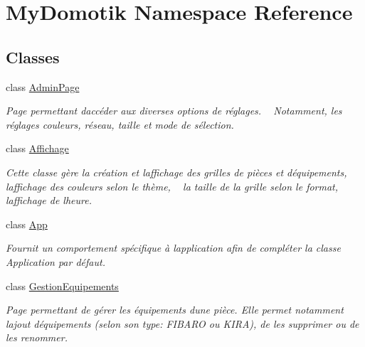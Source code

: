 \hypertarget{namespace_my_domotik}{}\section{My\+Domotik Namespace Reference}
\label{namespace_my_domotik}
\subsection*{Classes}
\begin{DoxyCompactItemize}
\item 
class \hyperlink{class_my_domotik_1_1_admin_page}{Admin\+Page}
\begin{DoxyCompactList}\small\item\em Page permettant d\textquotesingle{}accéder aux diverses options de réglages. ~\newline
Notamment, les réglages couleurs, réseau, taille et mode de sélection. \end{DoxyCompactList}\item 
class \hyperlink{class_my_domotik_1_1_affichage}{Affichage}
\begin{DoxyCompactList}\small\item\em Cette classe gère la création et l\textquotesingle{}affichage des grilles de pièces et d\textquotesingle{}équipements, ~\newline
l\textquotesingle{}affichage des couleurs selon le thème, ~\newline
la taille de la grille selon le format, ~\newline
l\textquotesingle{}affichage de l\textquotesingle{}heure. \end{DoxyCompactList}\item 
class \hyperlink{class_my_domotik_1_1_app}{App}
\begin{DoxyCompactList}\small\item\em Fournit un comportement spécifique à l\textquotesingle{}application afin de compléter la classe Application par défaut. \end{DoxyCompactList}\item 
class \hyperlink{class_my_domotik_1_1_gestion_equipements}{Gestion\+Equipements}
\begin{DoxyCompactList}\small\item\em Page permettant de gérer les équipements d\textquotesingle{}une pièce. Elle permet notamment l\textquotesingle{}ajout d\textquotesingle{}équipements (selon son type\+: F\+I\+B\+A\+RO ou K\+I\+RA), de les supprimer ou de les renommer. \end{DoxyCompactList}\item 

\end{DoxyCompactItemize}

